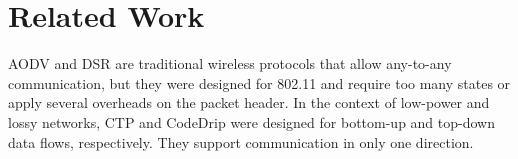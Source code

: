 \section{Related Work}
\label{sec:related}



AODV\cite{perkins2003ad} and DSR\cite{johnson2007rfc} are
traditional wireless protocols that allow any-to-any communication,
but they were designed for 802.11 and require too many states or
apply several overheads on the packet header.
In the context of low-power and lossy networks, CTP\cite{Fonseca:2009} and
CodeDrip\cite{junior2014codedrip} were designed for bottom-up and
top-down data flows, respectively. They support communication in only one
direction.



